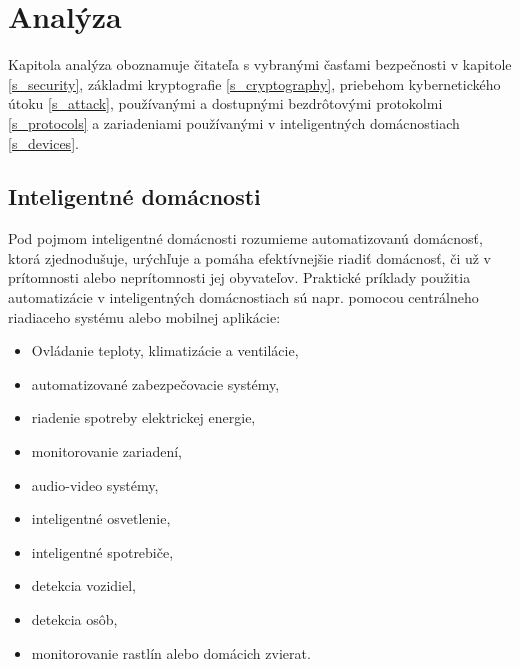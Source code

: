 \documentclass[12pt,a4paper,oneside,openright]{report}
\begin{document}
\listoffigures
\listoftables




\chapter{Analýza} \label{s_analyza}
Kapitola analýza oboznamuje čitateľa s vybranými časťami bezpečnosti v kapitole \ref{s_security}, základmi kryptografie \ref{s_cryptography}, priebehom kybernetického útoku \ref{s_attack}, používanými a dostupnými bezdrôtovými protokolmi \ref{s_protocols} a zariadeniami používanými v inteligentných domácnostiach \ref{s_devices}.

\section{Inteligentné domácnosti} \label{s_inteligent_house}
Pod pojmom inteligentné domácnosti rozumieme automatizovanú domácnosť, ktorá zjednodušuje, urýchľuje a pomáha efektívnejšie riadiť domácnosť, či už v prítomnosti alebo neprítomnosti jej obyvateľov.
Praktické príklady použitia automatizácie v inteligentných domácnostiach sú napr. pomocou centrálneho riadiaceho systému alebo mobilnej aplikácie\cite{cleverism}: 
\begin{itemize}
	\item Ovládanie teploty, klimatizácie a ventilácie,
	\item automatizované zabezpečovacie systémy,
	\item riadenie spotreby elektrickej energie,
	\item monitorovanie zariadení,
	\item audio-video systémy,
	\item inteligentné osvetlenie,
	\item inteligentné spotrebiče,
	\item detekcia vozidiel,
	\item detekcia osôb,
	\item monitorovanie rastlín alebo domácich zvierat.
\end{itemize}
\onehalfspacing
\end{document}
